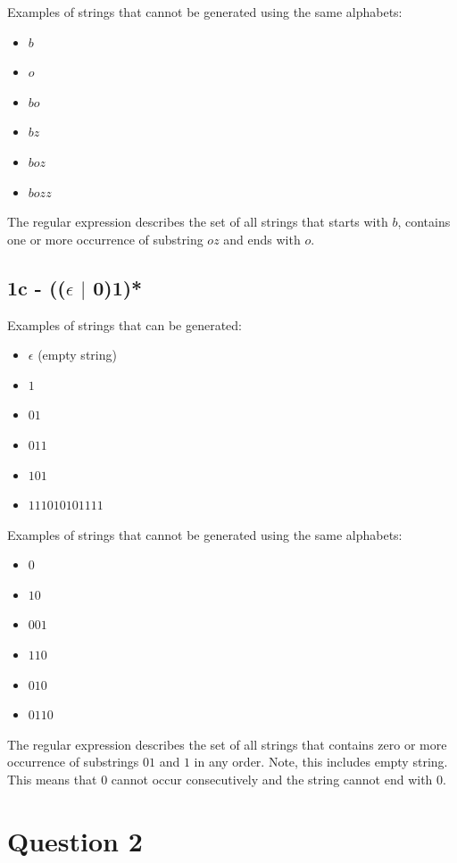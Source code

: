 \documentclass{article}
\begin{document}
    Examples of strings that cannot be generated using the same alphabets:
    \begin{itemize}
        \item $b$
        \item $o$
        \item $bo$
        \item $bz$
        \item $boz$
        \item $bozz$
    \end{itemize}

    The regular expression describes the set of all strings that starts with $b$, contains one or more occurrence of substring $oz$ and ends with $o$.

    \subsection*{1c - \textbf{(($\epsilon$ $|$ 0)1)*}}
    Examples of strings that can be generated:
    \begin{itemize}
        \item $\epsilon$ (empty string)
        \item $1$
        \item $01$
        \item $011$
        \item $101$
        \item $111010101111$
    \end{itemize}

    Examples of strings that cannot be generated using the same alphabets:
    \begin{itemize}
        \item $0$
        \item $10$
        \item $001$
        \item $110$
        \item $010$
        \item $0110$
    \end{itemize}

    The regular expression describes the set of all strings that contains zero or more occurrence of substrings $01$ and $1$ in any order. Note, this includes empty string. This means that $0$ cannot occur consecutively and the string cannot end with $0$.

    \section*{Question 2}
\end{document}
